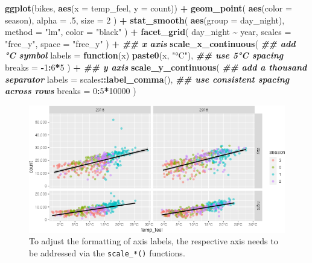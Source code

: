 \documentclass[
]{krantz}
\makeatletter
\newenvironment{Shaded}{\begin{snugshade}}{\end{snugshade}}
\newcommand{\AttributeTok}[1]{\textcolor[rgb]{0.27,0.27,0.27}{#1}}
\newcommand{\ControlFlowTok}[1]{\textcolor[rgb]{0.27,0.27,0.27}{\textbf{#1}}}
\newcommand{\DecValTok}[1]{\textcolor[rgb]{0.06,0.06,0.06}{#1}}
\newcommand{\DocumentationTok}[1]{\textcolor[rgb]{0.37,0.37,0.37}{\textbf{\textit{#1}}}}
\newcommand{\FunctionTok}[1]{\textcolor[rgb]{0.27,0.27,0.27}{\textbf{#1}}}
\newcommand{\NormalTok}[1]{#1}
\newcommand{\SpecialCharTok}[1]{\textcolor[rgb]{0.43,0.43,0.43}{\textbf{#1}}}
\newcommand{\StringTok}[1]{\textcolor[rgb]{0.5,0.5,0.5}{#1}}
\newenvironment{kframe}{%
\medskip{}
\setlength{\fboxsep}{.8em}
 \def\at@end@of@kframe{}%
 \ifinner\ifhmode%
  \def\at@end@of@kframe{\end{minipage}}%
  \begin{minipage}{\columnwidth}%
 \fi\fi%
 \def\FrameCommand##1{\hskip\@totalleftmargin \hskip-\fboxsep
 \colorbox{shadecolor}{##1}\hskip-\fboxsep
     \hskip-\linewidth \hskip-\@totalleftmargin \hskip\columnwidth}%
 \MakeFramed {\advance\hsize-\width
   \@totalleftmargin\z@ \linewidth\hsize
   \@setminipage}}%
 {\par\unskip\endMakeFramed%
 \at@end@of@kframe}
\renewenvironment{Shaded}{\begin{kframe}}{\end{kframe}}
\makeatother
\begin{document}
\begin{Shaded}
\begin{Highlighting}[]
\FunctionTok{ggplot}\NormalTok{(bikes, }\FunctionTok{aes}\NormalTok{(}\AttributeTok{x =}\NormalTok{ temp\_feel, }\AttributeTok{y =}\NormalTok{ count)) }\SpecialCharTok{+} 
  \FunctionTok{geom\_point}\NormalTok{(}
    \FunctionTok{aes}\NormalTok{(}\AttributeTok{color =}\NormalTok{ season), }\AttributeTok{alpha =}\NormalTok{ .}\DecValTok{5}\NormalTok{, }\AttributeTok{size =} \DecValTok{2}
\NormalTok{  ) }\SpecialCharTok{+} 
  \FunctionTok{stat\_smooth}\NormalTok{(}
    \FunctionTok{aes}\NormalTok{(}\AttributeTok{group =}\NormalTok{ day\_night), }\AttributeTok{method =} \StringTok{"lm"}\NormalTok{, }\AttributeTok{color =} \StringTok{"black"}
\NormalTok{  ) }\SpecialCharTok{+}
  \FunctionTok{facet\_grid}\NormalTok{(}
\NormalTok{    day\_night }\SpecialCharTok{\textasciitilde{}}\NormalTok{ year, }\AttributeTok{scales =} \StringTok{"free\_y"}\NormalTok{, }\AttributeTok{space =} \StringTok{"free\_y"}
\NormalTok{  ) }\SpecialCharTok{+}
  \DocumentationTok{\#\# x axis}
  \FunctionTok{scale\_x\_continuous}\NormalTok{(}
    \DocumentationTok{\#\# add °C symbol}
    \AttributeTok{labels =} \ControlFlowTok{function}\NormalTok{(x) }\FunctionTok{paste0}\NormalTok{(x, }\StringTok{"°C"}\NormalTok{), }
    \DocumentationTok{\#\# use 5°C spacing}
    \AttributeTok{breaks =} \SpecialCharTok{{-}}\DecValTok{1}\SpecialCharTok{:}\DecValTok{6}\SpecialCharTok{*}\DecValTok{5}
\NormalTok{  ) }\SpecialCharTok{+}
  \DocumentationTok{\#\# y axis}
  \FunctionTok{scale\_y\_continuous}\NormalTok{(}
    \DocumentationTok{\#\# add a thousand separator}
    \AttributeTok{labels =}\NormalTok{ scales}\SpecialCharTok{::}\FunctionTok{label\_comma}\NormalTok{(), }
    \DocumentationTok{\#\# use consistent spacing across rows}
    \AttributeTok{breaks =} \DecValTok{0}\SpecialCharTok{:}\DecValTok{5}\SpecialCharTok{*}\DecValTok{10000}
\NormalTok{  )}
\end{Highlighting}
\end{Shaded}

\begin{figure}
\centering
\includegraphics{bookdown_files/figure-latex/04ggplotLabelsAxes-1.png}
\caption{\label{fig:04ggplotLabelsAxes}To adjust the formatting of axis labels, the respective axis needs to be addressed via the \texttt{scale\_*()} functions.}
\end{figure}
\end{document}
